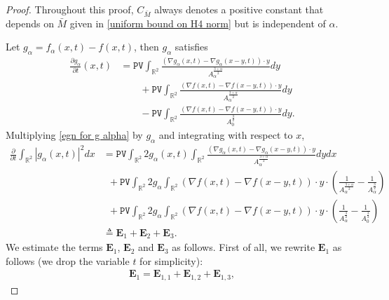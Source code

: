 \documentclass[10pt,a4paper]{amsart}
\newcommand{\PV}{\texttt{PV}}
\begin{document}
\begin{proof}
Throughout this proof, $C_{\bar{M}}$ always denotes a positive constant that depends on $\bar{M}$ given in \eqref{uniform bound on H4 norm} but is independent of $\alpha$. 

Let $g_{\alpha}=f_{\alpha}(x, t)-f(x, t)$, then $g_{\alpha}$ satisfies
\begin{equation}\label{egn for g alpha}
\begin{split}
\frac{\partial g_{\alpha}}{\partial t}(x, t) & = \PV \int_{\mathbb{R}^{2}} \frac{\left(\nabla g_{\alpha}(x, t)-\nabla g_{\alpha}(x-y, t)\right) \cdot y}{A_{\alpha}^{\frac{3+\alpha}{2}}} d y \\
& \qquad+ \PV \int_{\mathbb{R}^{2}} \frac{(\nabla f(x, t)-\nabla f(x-y, t)) \cdot y}{A_{\alpha}^{\frac{3+\alpha}{2}}} d y \\
& \qquad- \PV \int_{\mathbb{R}^{2}} \frac{(\nabla f(x, t)-\nabla f(x-y, t)) \cdot y}{A_{0}^{\frac{3}{2}}} d y. 
\end{split}
\end{equation} 
Multiplying \eqref{egn for g alpha} by $g_{\alpha}$ and integrating with respect to $x$,
\begin{equation*} 
\begin{split}
 \frac{\partial}{\partial t} \int_{\mathbb{R}^{2}}\left|g_{\alpha}(x, t)\right|^{2} d x&=\PV \int_{\mathbb{R}^{2}} 2g_{\alpha}(x, t) \int_{\mathbb{R}^{2}} \frac{\left(\nabla g_{\alpha}(x, t)-\nabla g_{\alpha}(x-y, t)\right) \cdot y}{A_{\alpha}^{\frac{3+\alpha}{2}}} d y d x \\
&\,\,\,+\PV \int_{\mathbb{R}^{2}} 2g_{\alpha} \int_{\mathbb{R}^{2}}(\nabla f(x, t)-\nabla f(x-y, t)) \cdot y \cdot\left(\frac{1}{A_{\alpha}^{\frac{3+\alpha}{2}}}-\frac{1}{A_{\alpha}^\frac{3}{2}}\right) \\
&\,\,\,+\PV \int_{\mathbb{R}^{2}} 2g_{\alpha} \int_{\mathbb{R}^{2}}(\nabla f(x, t)-\nabla f(x-y, t)) \cdot y \cdot\left(\frac{1}{A_{\alpha}^\frac{3}{2}}-\frac{1}{A_{0}^\frac{3}{2}}\right) \\
&\triangleq \mathbf{E}_{1}+\mathbf{E}_{2}+\mathbf{E}_{3}. 
\end{split}
\end{equation*}
We estimate the terms $\mathbf{E}_{1}$, $\mathbf{E}_{2}$ and $\mathbf{E}_{3}$ as follows. First of all, we rewrite $\mathbf{E}_{1}$ as follows (we drop the variable $t$ for simplicity):
\begin{align*}
\mathbf{E}_{1}=\mathbf{E}_{1,1}+\mathbf{E}_{1,2}+\mathbf{E}_{1,3},
\end{align*}

\end{proof}
\end{document}
